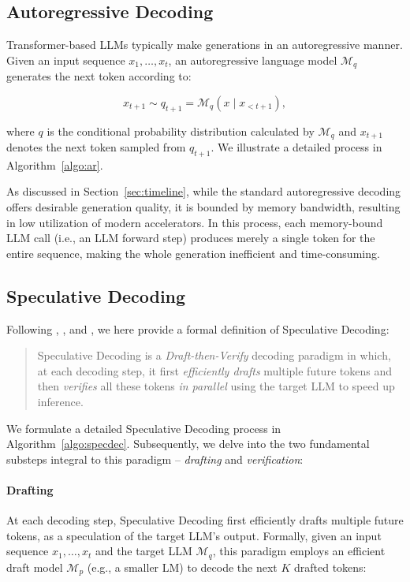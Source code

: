 \subsection{Autoregressive Decoding}
\label{sec:ar}
Transformer-based LLMs typically make generations in an autoregressive manner. Given an input sequence $x_1, \dots, x_t$, an autoregressive language model $\mathcal{M}_{q}$ generates the next token according to:

\begin{equation}\label{eq:ar}
    x_{t+1} \sim q_{t+1} = \mathcal{M}_q\left(x\mid x_{<t+1}\right),
\end{equation}

where $q$ is the conditional probability distribution calculated by $\mathcal{M}_{q}$ and $x_{t+1}$ denotes the next token sampled from $q_{t+1}$. We illustrate a detailed process in Algorithm~\ref{algo:ar}.

As discussed in Section~\ref{sec:timeline}, while the standard autoregressive decoding offers desirable generation quality, it is bounded by memory bandwidth, resulting in low utilization of modern accelerators. In this process, each memory-bound LLM call (i.e., an LLM forward step) produces merely a single token for the entire sequence, making the whole generation inefficient and time-consuming.

\subsection{Speculative Decoding}
\label{sec:specdec}
Following \citet{xia:2022specdec}, \citet{Leviathan:2023specdec}, and \citet{Chen:2023specsampling}, we here provide a formal definition of Speculative Decoding:

\begin{quote}
    Speculative Decoding is a \textit{Draft-then-Verify} decoding paradigm in which, at each decoding step, it first \textit{efficiently drafts} multiple future tokens and then \textit{verifies} all these tokens \textit{in parallel} using the target LLM to speed up inference.
\end{quote}

We formulate a detailed Speculative Decoding process in Algorithm~\ref{algo:specdec}. Subsequently, we delve into the two fundamental substeps integral to this paradigm -- \textit{drafting} and \textit{verification}:

\paragraph{Drafting} At each decoding step, Speculative Decoding first efficiently drafts multiple future tokens, as a speculation of the target LLM's output. Formally, given an input sequence $x_1, \dots, x_t$ and the target LLM $\mathcal{M}_{q}$, this paradigm employs an efficient draft model $\mathcal{M}_{p}$ (e.g., a smaller LM) to decode the next $K$ drafted tokens:


